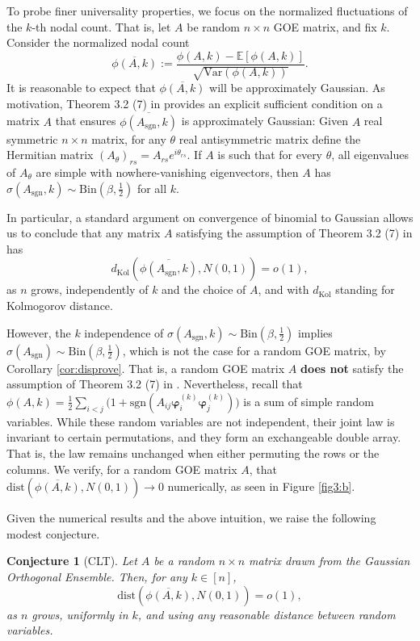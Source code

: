 \documentclass[reqno]{amsart}
\numberwithin{equation}{section}
\newcommand\E{\mathbb{E}}
\newtheorem{conjecture}[theorem]{Conjecture}
\begin{document}
To probe finer universality properties, we focus on the normalized fluctuations of the $k$-th nodal count. That is, let $A$ be random $n\times n$ GOE matrix, and fix $k$. Consider the normalized nodal count
$$\overline{\phi(A,k)}:=\frac{\phi(A,k) - \E\left[\phi(A,k)\right]}{\sqrt{\mathrm{Var}(\phi(A,k))}}.$$ 
It is reasonable to expect that $\overline{\phi(A,k)}$ will be approximately Gaussian. As motivation, Theorem 3.2 (7) in \cite{alon2023morse} provides an explicit sufficient condition on a matrix $A$ that ensures $\overline{\phi(A_{\mathrm{sgn}},k)}$ is approximately Gaussian:  
Given $A$ real symmetric $n\times n$ matrix, for any $\theta$ real antisymmetric matrix define the Hermitian matrix $(A_{\theta})_{rs}=A_{rs}e^{i\theta_{rs}}$. If $A$ is such that for every $\theta$, all eigenvalues of $A_{\theta}$ are simple with nowhere-vanishing eigenvectors, then $A$ has $\sigma(A_{\mathrm{sgn}},k)\sim \mathrm{Bin}(\beta,\frac{1}{2})$ for all $k$. 

In particular, a standard argument on convergence of binomial to Gaussian allows us to conclude that any matrix $A$ satisfying the assumption of Theorem 3.2 (7) in \cite{alon2023morse} has
\[d_\mathrm{Kol}\left(\overline{\phi(A_{\mathrm{sgn}},k)},N(0,1)\right)=o(1),\]
as $n$ grows, independently of $k$ and the choice of $A$, and with $d_\mathrm{Kol}$ standing for Kolmogorov distance.

However, the $k$ independence of $\sigma(A_{\mathrm{sgn}},k)\sim \mathrm{Bin}(\beta,\frac{1}{2})$ implies $\sigma(A_{\mathrm{sgn}})\sim \mathrm{Bin}(\beta,\frac{1}{2})$, which is not the case for a random GOE matrix, by 
Corollary \ref{cor:disprove}. That is, a random GOE matrix $A$ \textbf{does not} satisfy the assumption of Theorem 3.2 (7) in \cite{alon2023morse}.
 Nevertheless, recall that $\phi(A,k) = \frac{1}{2}\sum_{i<j}\big(1+\mathrm{sgn}(A_{ij}\bm \varphi^{(k)}_i \bm \varphi^{(k)}_j)\big)$ is a sum of simple random variables. While these random variables are not independent, their joint law is invariant to certain permutations, and they form an exchangeable double array. That is, the law remains unchanged when either permuting the rows or the columns. We verify, for a random GOE matrix $A$, that $\mathrm{dist}\left(\overline{\phi(A,k)},N(0,1)\right)\to 0$ numerically, as seen in Figure \ref{fig3:b}.

Given the numerical results and the above intuition, we raise the following modest conjecture.
\begin{conjecture}[CLT] \label{conj:CLT}
Let $A$ be a random $n\times n$ matrix drawn from the Gaussian Orthogonal Ensemble. Then, for any $k\in[n]$,  
\[\mathrm{dist}\left(\overline{\phi(A,k)},N(0,1)\right)=o(1),\] 
as $n$ grows, uniformly in $k$, and using any reasonable distance between random variables.
\end{conjecture}
\end{document}
